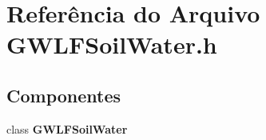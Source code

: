 \section{Referência do Arquivo G\+W\+L\+F\+Soil\+Water.\+h}
\label{_g_w_l_f_soil_water_8h}
\subsection*{Componentes}
\begin{DoxyCompactItemize}
\item 
class {\bf G\+W\+L\+F\+Soil\+Water}
\end{DoxyCompactItemize}
